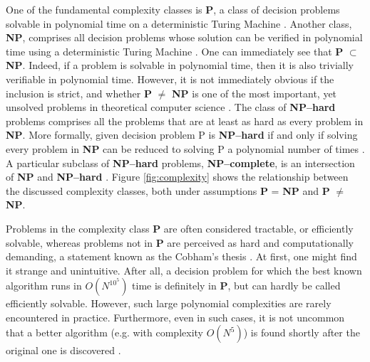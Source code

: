 One of the fundamental complexity classes is \textbf{P}, a class of decision problems solvable in polynomial time on a deterministic Turing Machine  \cite{arora}. Another class, \textbf{NP}, comprises all decision problems whose solution can be verified in polynomial time using a deterministic Turing Machine \cite{arora}.
One can immediately see that \textbf{P} $\subset$ \textbf{NP}. Indeed, if a problem is solvable in polynomial time, then it is also trivially verifiable in polynomial time. However, it is not immediately obvious if the inclusion is strict, and whether \textbf{P} $\ne$ \textbf{NP} is one of the most important, yet unsolved problems in theoretical computer science \cite{fortnow}.
The class of \textbf{NP--hard} problems comprises all the problems that are at least as hard as
every problem in \textbf{NP}. More formally, given decision problem P is \textbf{NP--hard} if and
only if solving every problem in \textbf{NP} can be reduced to solving P a polynomial number of times
\cite{arora}. A particular subclass of \textbf{NP--hard} problems, \textbf{NP--complete}, is an
intersection of \textbf{NP} and \textbf{NP--hard} \cite{arora}. Figure \ref{fig:complexity} shows
the relationship between the discussed complexity classes, both under assumptions \textbf{P} =
\textbf{NP} and \textbf{P} $\ne$ \textbf{NP}.

Problems in the complexity class \textbf{P} are often considered tractable, or efficiently solvable,
whereas problems not in \textbf{P} are perceived as hard and computationally demanding, a statement
known as the Cobham's thesis \cite{cobham, arora}. At first, one might find it strange and
unintuitive. After all, a decision problem for which the best known algorithm runs in $O(N^{10^5})$
time is definitely in  \textbf{P}, but can hardly be called efficiently solvable. However, such
large polynomial complexities are rarely encountered in practice. Furthermore, even in such cases,
it is not uncommon that a better algorithm (e.g. with complexity $O(N^5)$) is found shortly after
the original one is discovered \cite{arora}.

